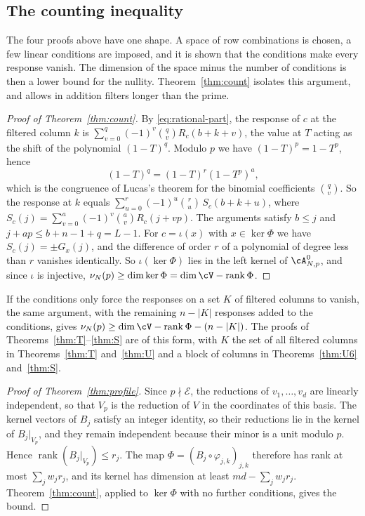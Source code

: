 \subsection{The counting inequality}
The four proofs above have one shape. A space of row combinations is chosen, a few linear conditions are
imposed, and it is shown that the conditions make every response vanish. The dimension of the space minus
the number of conditions is then a lower bound for the nullity. Theorem~\ref{thm:count} isolates this
argument, and allows in addition filters longer than the prime.

\begin{proof}[Proof of Theorem~\ref{thm:count}]
By \eqref{eq:rational-part}, the response of $c$ at the filtered column $k$ is
$\sum_{v=0}^q(-1)^v\binom qvR_c(b+k+v)$, the value at $T$ acting as the shift of the polynomial
$(1-T)^q$. Modulo $p$ we have $(1-T)^p=1-T^p$, hence
\[
 (1-T)^q=(1-T)^r(1-T^p)^a ,
\]
which is the congruence of Lucas's theorem for the binomial coefficients $\binom qv$. So the response at
$k$ equals $\sum_{u=0}^r(-1)^u\binom ru\,S_c(b+k+u)$, where
$S_c(j)=\sum_{v=0}^a(-1)^v\binom av R_c(j+vp)$. The arguments satisfy $b\le j$ and $j+ap\le b+n-1+q=L-1$.
For $c=\iota(x)$ with $x\in\ker\Phi$ we have $S_c(j)=\pm G_x(j)$, and the difference of order $r$ of a
polynomial of degree less than $r$ vanishes identically. So $\iota(\ker\Phi)$ lies in the left kernel of
$\cA^0_{N,p}$, and since $\iota$ is injective, $\nu_N(p)\ge\dim\ker\Phi=\dim\cV-\operatorname{rank}\Phi$.
\end{proof}

If the conditions only force the responses on a set $K$ of filtered columns to vanish, the same argument,
with the remaining $n-|K|$ responses added to the conditions, gives
$\nu_N(p)\ge\dim\cV-\operatorname{rank}\Phi-(n-|K|)$. The proofs of Theorems~\ref{thm:T}--\ref{thm:S} are of
this form, with $K$ the set of all filtered columns in Theorems~\ref{thm:T} and~\ref{thm:U} and a block of
columns in Theorems~\ref{thm:U6} and~\ref{thm:S}.

\begin{proof}[Proof of Theorem~\ref{thm:profile}]
Since $p\nmid\mathcal E$, the reductions of $v_1,\dots,v_d$ are linearly independent, so that $V_p$ is the
reduction of $V$ in the coordinates of this basis. The kernel vectors of $B_j$ satisfy an integer identity,
so their reductions lie in the kernel of $B_j|_{V_p}$, and they remain independent because their minor is a
unit modulo $p$. Hence $\operatorname{rank}(B_j|_{V_p})\le r_j$. The map
$\Phi=(B_j\circ\varphi_{j,k})_{j,k}$ therefore has rank at most $\sum_jw_jr_j$, and its kernel has dimension at
least $md-\sum_jw_jr_j$. Theorem~\ref{thm:count}, applied to $\ker\Phi$ with no further conditions, gives
the bound.
\end{proof}

